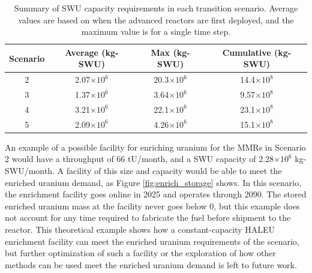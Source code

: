 \begin{table}
    \centering
    \caption{Summary of \gls{SWU} capacity requirements in each transition scenario. 
    Average values are based on when the advanced reactors are first deployed, 
    and the maximum value is for a single time step.}
    \label{tab:SWU_summary}
    \begin{tabular}{c c c c}
        \hline
        Scenario & Average (kg-SWU) & Max (kg-SWU) & Cumulative  (kg-SWU) \\\hline
        2 & 2.07$\times 10^6$ & 20.3$\times 10^6$ & 14.4$\times 10^8$ \\
        3 & 1.37$\times 10^6$ & 3.64$\times 10^6$ & 9.57$\times 10^8$ \\
        4 & 3.21$\times 10^6$ & 22.1$\times 10^6$ & 23.1$\times 10^8$ \\
        5 & 2.09$\times 10^6$ & 4.26$\times 10^6$ & 15.1$\times 10^8$
        \\\hline       
    \end{tabular}
\end{table}

An example of a possible facility for enriching uranium for the \glspl{MMR} in 
Scenario 2 would 
have a throughput of 66 tU/month, and a \gls{SWU} capacity of 2.28$\times 10^6$
kg-SWU/month. A facility of this size and capacity would be able to meet the 
enriched uranium demand, as Figure \ref{fig:enrich_storage}
shows. In this scenario, the enrichment facility goes online in 2025 and operates 
through 2090. The stored enriched uranium mass at the facility never goes below 0, 
but this example does not 
account for any time required to fabricate the fuel before shipment to the reactor.
This theoretical example shows how a constant-capacity \gls{HALEU} enrichment 
facility can meet the enriched uranium requirements of the scenario, but further 
optimization of such a facility or the exploration of how other methods can be
used meet the enriched uranium demand is left to future work. 

